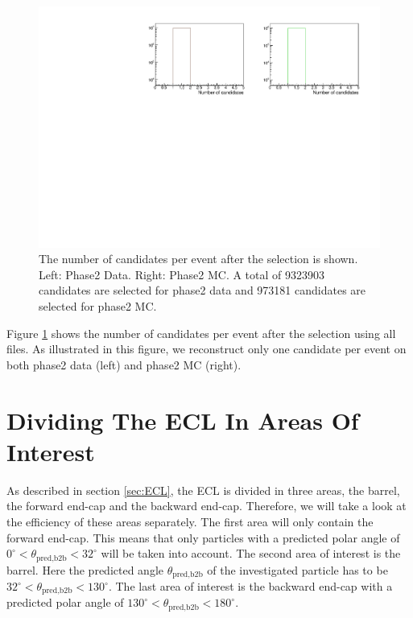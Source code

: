 \documentclass[a4paper,11pt,twosided,final,german,openbib,pdftex,listof=totoc,bibliography=totoc]{scrbook}
\begin{document}
\begin{figure}[h!]
	\includegraphics[width=\textwidth]{Plots/master/CCand.pdf}
	\caption[Total Number Of Events After The Selection]{The number of candidates per event after the selection is shown. Left: Phase2 Data. Right: Phase2 MC. A total of 9323903 candidates are selected for phase2 data and 973181 candidates are selected for phase2 MC.}
	\label{fig:nCandAS}
\end{figure}


Figure \ref{fig:nCandAS} shows the number of candidates per event after the selection using all files. As illustrated in this figure, we reconstruct only one candidate per event on both phase2 data (left) and phase2 MC (right).


\section{Dividing The ECL In Areas Of Interest}
\label{sec:DivECL}

As described in section \ref{sec:ECL}, the ECL is divided in three areas, the barrel, the forward end-cap and the backward end-cap. Therefore, we will take a look at the efficiency of these areas separately. The first area will only contain the forward end-cap. This means that only particles with a predicted polar angle of $0^\circ <\theta_{\textrm{pred,b2b}}<32^\circ$ will be taken into account. The second area of interest is the barrel. Here the predicted angle $\theta_{\textrm{pred,b2b}}$ of the investigated particle has to be $32^\circ < \theta_{\textrm{pred,b2b}} < 130^\circ$. The last area of interest is the backward end-cap with a predicted polar angle of $130^\circ <\theta_{\textrm{pred,b2b}} < 180^\circ$.
\newline  
\end{document}
